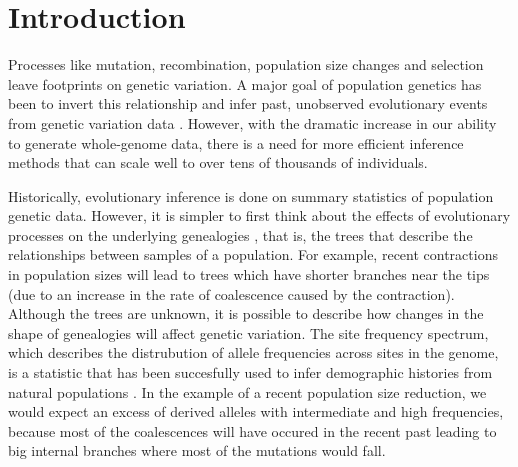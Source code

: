 \section{Introduction}

Processes like mutation, recombination, population size changes and selection leave footprints on genetic variation.
A major goal of population genetics has been to invert this relationship and infer past, unobserved evolutionary events from genetic variation data \citep{schraiber_methods_2015}.
However, with the dramatic increase in our ability to generate whole-genome data,
there is a need for more efficient inference methods that can scale well to over tens of thousands of individuals.

Historically, evolutionary inference is done on summary statistics of population genetic data.
However, it is simpler to first think about the effects of evolutionary processes on the underlying genealogies \citep{wakely_coalescent_2016},
that is, the trees that describe the relationships between samples of a population.
For example, recent contractions in population sizes will lead to trees which have shorter branches near the tips (due to an increase in the rate of coalescence caused by the contraction).
Although the trees are unknown, it is possible to describe how changes in the shape of genealogies will affect genetic variation.
The site frequency spectrum,
which describes the distrubution of allele frequencies across sites in the genome,
is a statistic that has been succesfully used to infer demographic histories from natural populations \citep{gutenkunst_inferring_2009, schraiber_methods_2015}.
In the example of a recent population size reduction,
we would expect an excess of derived alleles with intermediate and high frequencies,
because most of the coalescences will have occured in the recent past leading to big internal branches where most of the mutations would fall.



